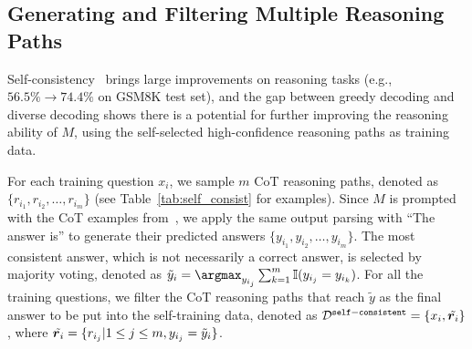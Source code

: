 \subsection{Generating and Filtering Multiple Reasoning Paths}%
Self-consistency~\citep{Wang2022SelfConsistencyIC} brings large improvements on reasoning tasks (e.g., $56.5\%\rightarrow74.4\%$ on GSM8K test set), and the gap between greedy decoding and diverse decoding shows there is a potential for further improving the reasoning ability of $M$, using the self-selected high-confidence reasoning paths as training data.



For each training question ${x_i}$, we sample $m$ CoT reasoning paths, denoted as $\{r_{i_1}, r_{i_2}, \dots, r_{i_m}\}$ (see Table~\ref{tab:self_consist} for examples). 
Since $M$ is prompted with the CoT examples from~\citet{Wei2022ChainOT}, we apply the same output parsing with ``The answer is'' to generate their predicted answers  $\{y_{i_1}, y_{i_2}, \dots, y_{i_m}\}$.
The most consistent answer, which is not necessarily a correct answer, is selected by majority voting, denoted as $\tilde{y}_i=\argmax_{y_{i_j}}\sum_{k=1}^m\mathbb{I}(y_{i_j}=y_{i_k})$.
For all the training questions, we filter the CoT reasoning paths that reach $\tilde{y}$ as the final answer to be put into the self-training data, denoted as $\mathcal{D}^{\mathtt{self-consistent}}=\{x_i, \tilde{\boldsymbol{r}_i}\}$, where $\tilde{\boldsymbol{r}_i} = \{r_{i_j}|1\leq j \leq m, y_{i_j} = \tilde{y}_i\}$.

